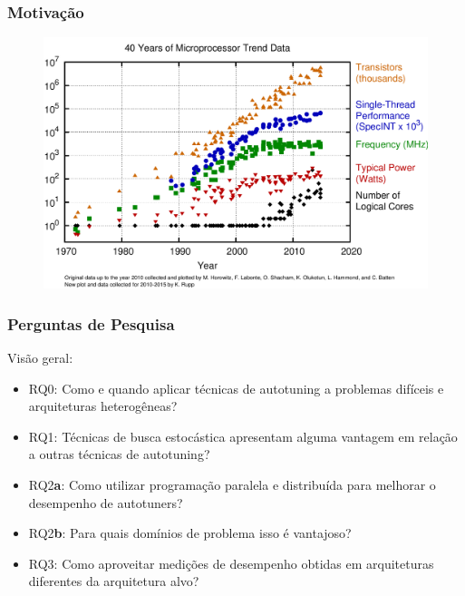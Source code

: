 \documentclass[10pt, compress]{beamer}
\begin{document}
\begin{frame}[fragile]
    \frametitle{Motivação}
    \begin{figure}[H]
        \centering
        \includegraphics[width=1\textwidth]{40years}
    \end{figure}%
    \let\thefootnote\relax{}
\end{frame}

\begin{frame}[fragile]
    \frametitle{Perguntas de Pesquisa}
    Visão geral:
    \begin{itemize}
        \item \alert{RQ0}: Como e quando aplicar técnicas de
            autotuning a problemas difíceis e arquiteturas heterogêneas?
            \pause
        \item \alert{RQ1}: Técnicas de busca estocástica apresentam
            alguma vantagem em relação a outras técnicas de autotuning?
            \pause
        \item \alert{RQ2\textbf{a}}: Como utilizar programação paralela e
            distribuída para melhorar o desempenho de autotuners?
        \item \alert{RQ2\textbf{b}}: Para quais domínios de problema isso é
            vantajoso?
            \pause
        \item \alert{RQ3}: Como aproveitar medições de desempenho obtidas
            em arquiteturas diferentes da arquitetura alvo?
    \end{itemize}
\end{frame}
\end{document}
